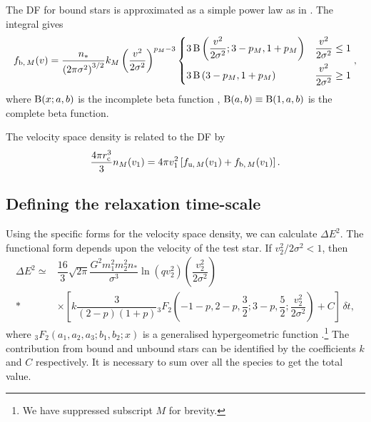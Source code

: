 The DF for bound stars is approximated as a simple power law as in . The integral gives
\begin{equation}
f_{\mathrm{b},\,M}(v) = \dfrac{n_\ast}{\left(2\pi\sigma^2\right)^{3/2}}k_M \left(\dfrac{v^2}{2\sigma^2}\right)^{p_M - 3}\begin{cases}
3 \Beta\left(\dfrac{v^2}{2\sigma^2}; 3 - p_M, 1 + p_M\right) \vspace{1mm} & \dfrac{v^2}{2\sigma^2} \leq 1 \\
3 \Beta\left(3 - p_M, 1 + p_M\right) & \dfrac{v^2}{2\sigma^2} \geq 1
\end{cases},
\end{equation}
where $\operatorname{B}(x;a,b)$ is the incomplete beta function \citep[8.17]{Olver2010}, $\operatorname{B}(a,b) \equiv \operatorname{B}(1,a,b)$ is the complete beta function.

The velocity space density is related to the DF by
\begin{equation}
\dfrac{4\pi r_\mathrm{c}^3}{3}n_M(v_1) = 4\pi v_1^2\left[f_{\mathrm{u},\,M}(v_1) + f_{\mathrm{b},\,M}(v_1)\right].
\end{equation}

\subsection{Defining the relaxation time-scale}

Using the specific forms for the velocity space density, we can calculate $\Delta E^2$. The functional form depends upon the velocity of the test star. If $v_2^2/2\sigma^2 < 1$, then
\begin{align}
\Delta E^2 \simeq {} & \dfrac{16}{3}\sqrt{2\pi}\dfrac{G^2m_1^2 m_2^2n_\ast}{\sigma^3}\ln\left(qv_2^2\right) \left(\dfrac{v_2^2}{2\sigma^2}\right) \nonumber \\*
{} & \times \left. \left[k \dfrac{3}{(2 - p)(1 + p)}{_3F_2}\left(-1-p,2-p,\dfrac{3}{2};3-p,\dfrac{5}{2};\dfrac{v_2^2}{2\sigma^2}\right) + C\right]\,\delta t, \right.
\label{eq:w-less-1}
\end{align}
where ${_3F_2}(a_1,a_2,a_3;b_1,b_2;x)$ is a generalised hypergeometric function \citep[section 16]{Olver2010}.\footnote{We have suppressed subscript $M$ for brevity.} The contribution from bound and unbound stars can be identified by the coefficients $k$ and $C$ respectively. It is necessary to sum over all the species to get the total value.


